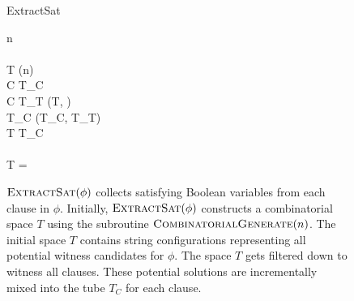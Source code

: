 
\begin{figure}[htbp]
\begin{center}

	\begin{pseudocode}{ExtractSat}{\phi}
	
	n  \phi \\
	\\
		T \GETS {}(n)\\
	
		\FOREACH {} C  \phi \DO
			\BEGIN
				T_C \GETS \emptyset \\
			
				\FOREACH {} \ell {} C \DO
					\BEGIN 
						T_T \GETS {}(T, \ell) \\
						T_C \GETS {}(T_C, T_T)
					\END \\
				T \GETS T_C \\
			\END \\
			
		\IF T = \emptyset
			\THEN {}\\
	\end{pseudocode}


\caption{$\text{\sc ExtractSat}(\phi)$ collects satisfying Boolean variables from each clause in $\phi$.  Initially, $\text{\sc ExtractSat}(\phi)$ constructs a combinatorial space $T$ using the subroutine $\text{\sc CombinatorialGenerate}(n)$.  The initial space $T$ contains string configurations representing all potential witness candidates for $\phi$.  The space $T$ gets filtered down to witness all clauses.  These potential solutions are incrementally mixed into the tube $T_C$ for each clause.  }
\label{extractSatAlgorithm}
\end{center}
\end{figure}
